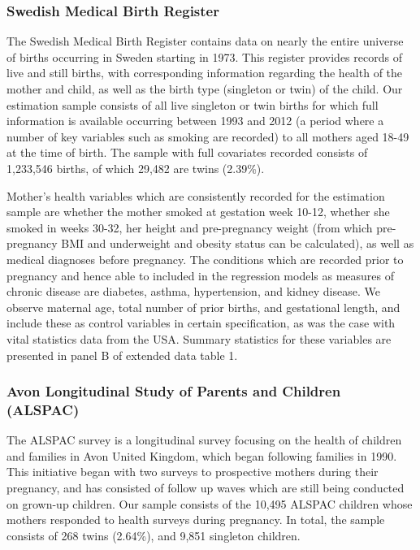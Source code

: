 \documentclass{nature}
\begin{document}
\begin{linenumbers}
\subsubsection{Swedish Medical Birth Register}
The Swedish Medical Birth Register contains data on nearly the entire universe of births occurring in Sweden starting in 1973\cite{EPC2003}.  This register provides records of live and still births, with corresponding information regarding the health of the mother and child, as well as the birth type (singleton or twin) of the child.  Our estimation sample consists of all live singleton or twin births for which full information is available occurring between 1993 and 2012 (a period where a number of key variables such as smoking are recorded) to all mothers aged 18-49 at the time of birth.  The sample with full covariates recorded consists of 1,233,546 births, of which 29,482 are twins (2.39\%). 

Mother's health variables which are consistently recorded for the estimation sample are whether the mother smoked at gestation week 10-12, whether she smoked in weeks 30-32, her height and pre-pregnancy weight (from which pre-pregnancy BMI and underweight and obesity status can be calculated), as well as medical diagnoses before pregnancy.  The conditions which are recorded prior to pregnancy and hence able to included in the regression models as measures of chronic disease are diabetes, asthma, hypertension, and kidney disease.  We observe maternal age, total number of prior births, and gestational length, and include these as control variables in certain specification, as was the case with vital statistics data from the USA.  Summary statistics for these variables are presented in panel B of extended data table 1.

\subsubsection{Avon Longitudinal Study of Parents and Children (ALSPAC)}
The ALSPAC survey is a longitudinal survey focusing on the health of children and families in Avon United Kingdom, which began following families in 1990.  This initiative began with two surveys to prospective mothers during their pregnancy, and has consisted of follow up waves which are still being conducted on grown-up children.  Our sample consists of the 10,495 ALSPAC children whose mothers responded to health surveys during pregnancy.  In total, the sample consists of 268 twins (2.64\%), and 9,851 singleton children.


\end{linenumbers}
\end{document}
